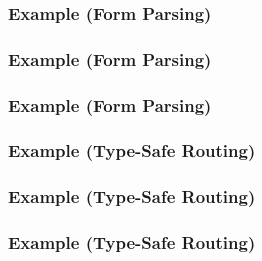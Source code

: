\begin{frame}
  \frametitle{Example (Form Parsing)}
  
\end{frame}

\begin{frame}
  \frametitle{Example (Form Parsing)}
  
\end{frame}


\begin{frame}
  \frametitle{Example (Form Parsing)}
  
\end{frame}

\begin{frame}
\end{frame}

\begin{frame}
\end{frame}

\begin{frame}
  \frametitle{Example (Type-Safe Routing)}
  
\end{frame}

\begin{frame}
  \frametitle{Example (Type-Safe Routing)}
  
\end{frame}

\begin{frame}
  \frametitle{Example (Type-Safe Routing)}
  
\end{frame}

